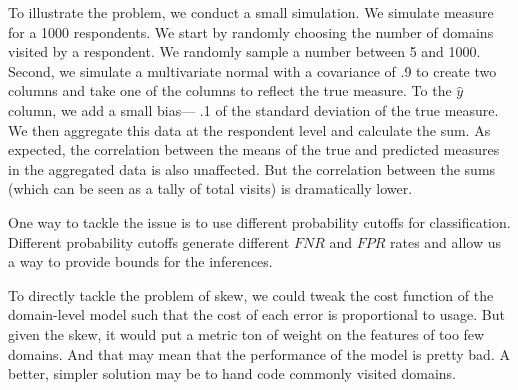 \documentclass[12pt, letterpaper]{article}
\begin{document}
To illustrate the problem, we conduct a small simulation. We simulate measure for a 1000 respondents. We start by randomly choosing the number of domains visited by a respondent. We randomly sample a number between 5 and 1000. Second, we simulate a multivariate normal with a covariance of .9 to create two columns and take one of the columns to reflect the true measure. To the $\hat{y}$ column, we add a small bias--- .1 of the standard deviation of the true measure. We then aggregate this data at the respondent level and calculate the sum. As expected, the correlation between the means of the true and predicted measures in the aggregated data is also unaffected. But the correlation between the sums (which can be seen as a tally of total visits) is dramatically lower.

One way to tackle the issue is to use different probability cutoffs for classification. Different probability cutoffs generate different $FNR$ and $FPR$ rates and allow us a way to provide bounds for the inferences.

To directly tackle the problem of skew, we could tweak the cost function of the domain-level model such that the cost of each error is proportional to usage. But given the skew, it would put a metric ton of weight on the features of too few domains. And that may mean that the performance of the model is pretty bad. A better, simpler solution may be to hand code commonly visited domains.

\clearpage


\end{document}
